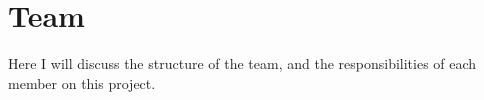 \chapter{Team}

Here I will discuss the structure of the team, and the responsibilities of each member on this project.




